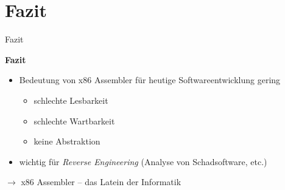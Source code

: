 \section{Fazit}

\begin{frame}{Fazit}
    \begin{center}
        \textbf{Fazit}
    \end{center}

    \begin{itemize}
        \item Bedeutung von x86 Assembler für heutige Softwareentwicklung gering
        \begin{itemize}
            \item schlechte Lesbarkeit
            \item schlechte Wartbarkeit
            \item keine Abstraktion
        \end{itemize}

        \item wichtig für \textit{Reverse Engineering} (Analyse von Schadsoftware, etc.)
    \end{itemize}

    \makebox{}

    $\rightarrow$ x86 Assembler – das Latein der Informatik
\end{frame}

